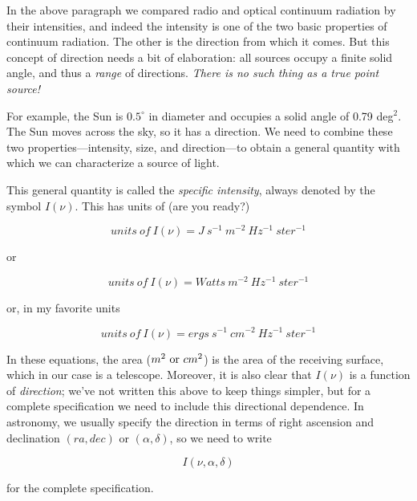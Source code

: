 \documentclass[psfig,preprint]{aastex}
\begin{document}
	In the above paragraph we compared radio and optical continuum
radiation by their intensities, and indeed the intensity is one of the
two basic properties of continuum radiation.  The other is the direction
from which it comes.  But this concept of direction needs a bit of
elaboration: all sources occupy a finite solid angle, and thus a {\it
range} of directions. {\it There is no such thing as a true point
source!} 

	For example, the Sun is $0.5^\circ$ in diameter and occupies a
solid angle of 0.79 deg$^2$.  The Sun moves across the sky, so it has a
direction. We need to combine these two properties---intensity, size, and
direction---to obtain a general quantity with which we can characterize
a source of light. 

	This general quantity is called the {\it specific intensity},
always denoted by the symbol $I(\nu)$.  This has units of (are you ready?)

\begin{mathletters}
\begin{equation}
units \ of \ I(\nu) = J \ s^{-1} \ m^{-2} \ Hz^{-1} \ ster^{-1}
\end{equation}

\noindent or

\begin{equation}
units \ of \ I(\nu) = Watts \ m^{-2} \ Hz^{-1} \ ster^{-1}
\end{equation}

\noindent or, in my favorite units

\begin{equation}
units \ of \ I(\nu) = ergs \ s^{-1} \ cm^{-2} \ Hz^{-1} \ ster^{-1}
\end{equation}

\noindent In these equations, the area ($m^2 \ {\rm or} \ cm^2$) is the
area of the receiving surface, which in our case is a telescope.
Moreover, it is also clear that $I(\nu)$ is a function of {\it
direction}; we've not written this above to keep things simpler, but for
a complete specification we need to include this directional dependence.
In astronomy, we usually specify the direction in terms of right
ascension and declination $(ra, dec)$ or $(\alpha, \delta)$, so we need
to write

\begin{equation}
I(\nu, \alpha, \delta)
\end{equation}
\end{mathletters}

\noindent for the complete specification.
\end{document}
